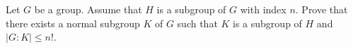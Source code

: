 \begin{prob}
Let $G$ be a group. Assume that $H$ is a subgroup of $G$ with index $n$. Prove that there exists a normal subgroup $K$ of $G$ such that $K$ is a subgroup of $H$ and $|G : K | \le n!$.  
\end{prob}